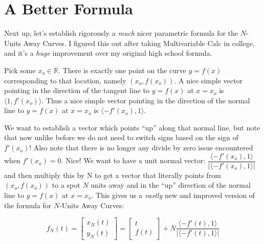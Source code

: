 \newcommand{\betterFormula}{

\begin{equation}
    f_N(t) = \begin{bmatrix}
        x_N(t) \\ y_N(t)
    \end{bmatrix} =
    \begin{bmatrix}
        t \\ f(t)
    \end{bmatrix} +
    N \dfrac{\langle -f'(t), 1 \rangle}{|\langle -f'(t), 1 \rangle|}
\end{equation}

}

\section{A Better Formula}

Next up, let’s establish rigorously a \textit{much} nicer parametric formula for the $N$-Units Away Curves. I figured this out after taking Multivariable Calc in college, and it’s a \textit{huge} improvement over my original high school formula.

Pick some $x_o \in \mathbb{R}$. There is exactly one point on the curve $y=f(x)$ corresponding to that location, namely $(x_o , f(x_o))$. A nice simple vector pointing in the direction of the tangent line to $y=f(x)$ at $x = x_o$ is $\langle 1, f'(x_o) \rangle$. Thus a nice simple vector
pointing in the direction of the normal line to $y = f(x)$ at $x = x_o$ is $\langle -f'(x_o), 1 \rangle$.

We want to establish a vector which points ``up'' along that normal line, but note that now unlike before we do not need to switch signs based on the sign of $f'(x_o)$! Also note that there is no longer any divide by zero issue encountered when $f'(x_o) = 0$. Nice! We want to have a unit normal vector: $\dfrac{\langle -f'(x_o), 1 \rangle}{|\langle -f'(x_o), 1 \rangle|}$ and then multiply this by N to get a vector that literally points from $(x_o, f(x_o))$ to a spot $N$ units away and in the ``up'' direction of the normal line to $y=f(x)$ at $x = x_o$. This gives us a \textit{vastly} new and improved version of the formula for $N$-Units Away Curves: \betterFormula